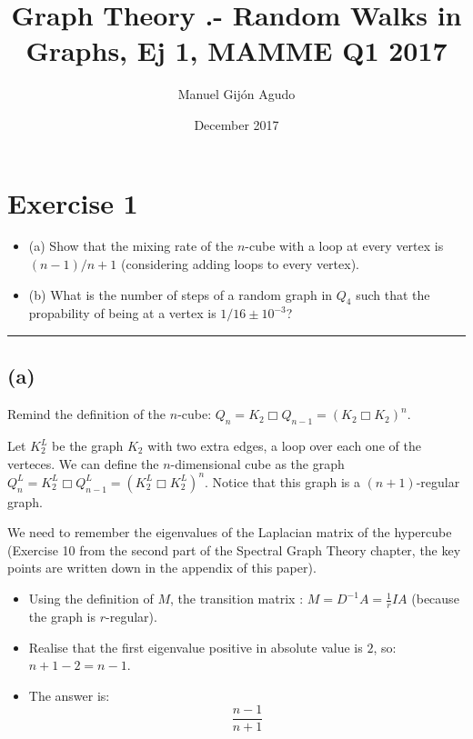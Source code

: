 \documentclass{article}
\title{Graph Theory .- Random Walks in Graphs, Ej 1, MAMME Q1 2017}
\author{Manuel Gijón Agudo}
\date{December 2017}
\begin{document}
\maketitle

\section*{Exercise 1}
\begin{itemize}
    \item (a) Show that the mixing rate of the $n$-cube with a loop at every vertex is $(n-1)/n + 1$ (considering adding loops to every vertex).
    \item (b) What is the number of steps of a random graph in $Q_{4}$ such that the propability of being at a vertex is $1/16 \pm 10^{-3}$?
\end{itemize}

\noindent
{\color{gray} \rule{\linewidth}{0.5mm} }

\subsection*{(a)}

\noindent Remind the definition of the $n$-cube: $Q_{n} = K_{2} \Box Q_{n-1} = (K_{2} \Box K_{2})^{n}$.


\noindent Let $K_{2}^{L}$ be the graph $K_{2}$ with two extra edges, a loop over each one of the verteces. We can define the $n$-dimensional cube as the graph $Q_{n}^{L} = K_{2}^{L} \Box Q_{n-1}^{L} = (K_{2}^{L} \Box K_{2}^{L})^{n}$. Notice that this graph is a $(n+1)$-regular graph. 


\noindent We need to remember the eigenvalues of the Laplacian matrix of the hypercube (Exercise 10 from the second part of the Spectral Graph Theory chapter, the key points are written down in the appendix of this paper).

\begin{itemize}
    \item Using the definition of $M$, the transition matrix : $M = D^{-1} A = \frac{1}{r} I A$ (because the graph is $r$-regular).
    \item Realise that the first eigenvalue positive in absolute value is $2$, so: $n + 1 - 2 = n - 1$.
    \item The answer is:
    $$
    \boxed{
    \frac{n - 1}{n + 1}
    }
    $$
\end{itemize}


\end{document}
